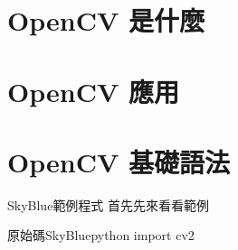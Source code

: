 \documentclass{article}
\begin{document}

\begin{large}


\section{OpenCV 是什麼}
\section{OpenCV 應用}
\section{OpenCV 基礎語法}
\begin{boxpar}{SkyBlue}{範例程式}
首先先來看看範例
    \begin{mintbox}{原始碼}{SkyBlue}{python}
import cv2
    \end{mintbox}
\end{boxpar}


\end{large}
\end{document}
